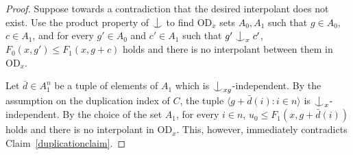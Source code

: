 \documentclass[10pt,a4paper]{amsart}
\newcommand{\forkindep}[1][]{%
  \mathrel{
    \mathop{
      \vcenter{
        \hbox{\oalign{\noalign{\kern-.3ex}\hfil$\vert$\hfil\cr
              \noalign{\kern-.7ex}
              $\smile$\cr\noalign{\kern-.3ex}}}
      }
    }\displaylimits_{#1}
  }
}
\newcommand{\vd}{\mathrm{OD}}
\begin{document}
\begin{proof}
Suppose towards a contradiction that the desired interpolant does not exist. Use the product property of $\forkindep$ to find $\vd_x$ sets $A_0, A_1$ such that $g\in A_0$, $c\in A_1$, and for every $g'\in A_0$ and $c'\in A_1$ such that $g'\forkindep_x c'$, $F_0(x, g')\leq F_1(x, g+c)$ holds and there is no interpolant between them in $\vd_x$.

Let $\bar d\in A_1^n$ be a tuple of elements of $A_1$ which is $\forkindep_{xg}$-independent. By the assumption on the duplication index of $C$, the tuple $\langle g+\bar d(i)\colon i\in n\rangle$ is $\forkindep_x$-independent. By the choice of the set $A_1$, for every $i\in n$, $u_0\leq F_1(x, g+\bar d(i))$ holds and there is no interpolant in $\vd_x$. This, however, immediately contradicts Claim~\ref{duplicationclaim}.
\end{proof}
\end{document}

